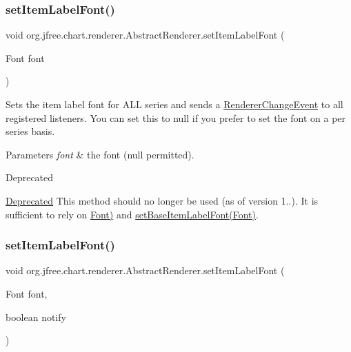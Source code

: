 \subsubsection{\texorpdfstring{set\+Item\+Label\+Font()}{setItemLabelFont()}\hspace{0.1cm}{\footnotesize\ttfamily [1/2]}}
{\footnotesize\ttfamily void org.\+jfree.\+chart.\+renderer.\+Abstract\+Renderer.\+set\+Item\+Label\+Font (\begin{DoxyParamCaption}\item[{Font}]{font }\end{DoxyParamCaption})}

Sets the item label font for A\+LL series and sends a \mbox{\hyperlink{}{Renderer\+Change\+Event}} to all registered listeners. You can set this to {\ttfamily null} if you prefer to set the font on a per series basis.


\begin{DoxyParams}{Parameters}
{\em font} & the font ({\ttfamily null} permitted).\\
\hline
\end{DoxyParams}
\begin{DoxyRefDesc}{Deprecated}
\item[\mbox{\hyperlink{deprecated__deprecated000132}{Deprecated}}]This method should no longer be used (as of version 1..). It is sufficient to rely on \mbox{\hyperlink{}{Font)}} and \mbox{\hyperlink{classorg_1_1jfree_1_1chart_1_1renderer_1_1_abstract_renderer_aced8e1ceab30b0c47a3397fc92a513e5}{set\+Base\+Item\+Label\+Font(\+Font)}}. \end{DoxyRefDesc}
\mbox{\label{classorg_1_1jfree_1_1chart_1_1renderer_1_1_abstract_renderer_a194db5ef303c821d5d902bdb04ad640e}} 
\subsubsection{\texorpdfstring{set\+Item\+Label\+Font()}{setItemLabelFont()}\hspace{0.1cm}{\footnotesize\ttfamily [2/2]}}
{\footnotesize\ttfamily void org.\+jfree.\+chart.\+renderer.\+Abstract\+Renderer.\+set\+Item\+Label\+Font (\begin{DoxyParamCaption}\item[{Font}]{font,  }\item[{boolean}]{notify }\end{DoxyParamCaption})}

